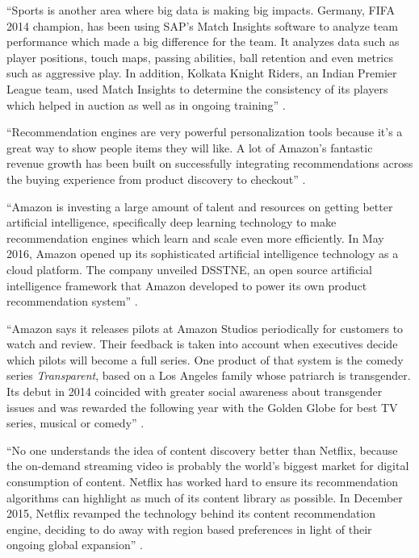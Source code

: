 \documentclass[sigconf]{acmart}
\begin{document}
``Sports is another area where big data is making big impacts. Germany, FIFA 2014 champion, has been using SAP's Match Insights software to analyze team performance which made a big difference for the team. It analyzes data such as player positions, touch maps, passing abilities, ball retention and even metrics such as aggressive play. In addition, Kolkata Knight Riders, an Indian Premier League team, used Match Insights to determine the consistency of its players which helped in auction as well as in ongoing training'' \cite{Karania2014industry}.

``Recommendation engines are very powerful personalization tools because it's a great way to show people items they will like. A lot of Amazon's fantastic revenue growth has been built on successfully integrating recommendations across the buying experience from product discovery to checkout'' \cite{Arora2016battle}.

``Amazon is investing a large amount of talent and resources on getting better artificial intelligence, specifically deep learning technology to make recommendation engines which learn and scale even more efficiently. In May 2016, Amazon opened up its sophisticated artificial intelligence technology as a cloud platform. The company unveiled DSSTNE, an open source artificial intelligence framework that Amazon developed to power its own product recommendation system'' \cite{Arora2016battle}.

``Amazon says it releases pilots at Amazon Studios periodically for customers to watch and review. Their feedback is taken into account when executives decide which pilots will become a full series.
One product of that system is the comedy series {\em Transparent}, based on a Los Angeles family whose patriarch is transgender. Its debut in 2014 coincided with greater social awareness about transgender issues and was rewarded the following year with the Golden Globe for best TV series, musical or comedy'' \cite{Whitley2016data}.

``No one understands the idea of content discovery better than Netflix, because the on-demand streaming video is probably the world's biggest market for digital consumption of content. Netflix has worked hard to ensure its recommendation algorithms can highlight as much of its content library as possible. In December 2015, Netflix revamped the technology behind its content recommendation engine, deciding to do away with region based preferences in light of their ongoing global expansion'' \cite{Arora2016battle}.
\end{document}
